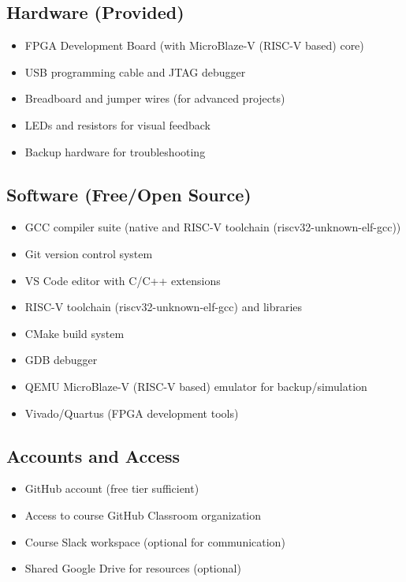 \documentclass[11pt,a4paper]{article}
\begin{document}
\subsection{Hardware (Provided)}
\begin{itemize}
    \item FPGA Development Board (with MicroBlaze-V (RISC-V based) core)
    \item USB programming cable and JTAG debugger
    \item Breadboard and jumper wires (for advanced projects)
    \item LEDs and resistors for visual feedback
    \item Backup hardware for troubleshooting
\end{itemize}

\subsection{Software (Free/Open Source)}
\begin{itemize}
    \item GCC compiler suite (native and RISC-V toolchain (riscv32-unknown-elf-gcc))
    \item Git version control system
    \item VS Code editor with C/C++ extensions
    \item RISC-V toolchain (riscv32-unknown-elf-gcc) and libraries
    \item CMake build system
    \item GDB debugger
    \item QEMU MicroBlaze-V (RISC-V based) emulator for backup/simulation
    \item Vivado/Quartus (FPGA development tools)
\end{itemize}

\subsection{Accounts and Access}
\begin{itemize}
    \item GitHub account (free tier sufficient)
    \item Access to course GitHub Classroom organization
    \item Course Slack workspace (optional for communication)
    \item Shared Google Drive for resources (optional)
\end{itemize}
\end{document}

